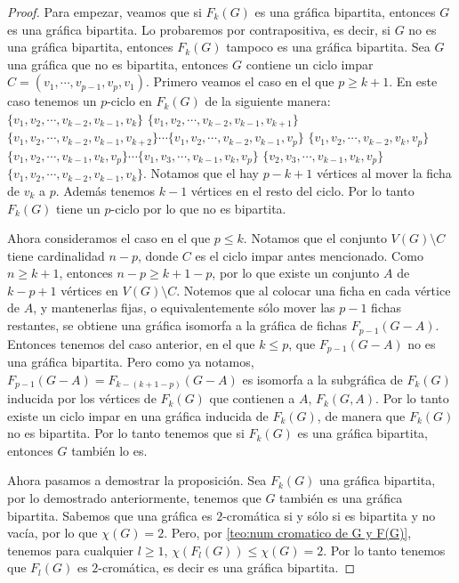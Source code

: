\begin{proof}
    Para empezar, veamos que si $F_k(G)$ es una gr\'afica bipartita, entonces
    $G$ es una gr\'afica bipartita. Lo probaremos por contrapositiva, es decir,
    si $G$ no es una gr\'afica bipartita, entonces $F_k(G)$ tampoco es una
    gr\'afica bipartita. Sea $G$ una gr\'afica que no es bipartita, entonces $G$
    contiene un ciclo impar $C=(v_1, \cdots, v_{p-1}, v_p, v_1)$. Primero veamos
    el caso en el que $p \geq k+1$. En este caso tenemos un $p$-ciclo en
    $F_k(G)$ de la siguiente manera: $\{v_1, v_2, \cdots, v_{k-2}, v_{k-1},
    v_k\}$ $\{v_1, v_2, \cdots, v_{k-2}, v_{k-1}, v_{k+1}\}$ $\{v_1, v_2, \cdots,
    v_{k-2}, v_{k-1}, v_{k+2}\} \cdots \{v_1, v_2, \cdots, v_{k-2}, v_{k-1},
    v_p\}$ $\{v_1, v_2, \cdots, v_{k-2}, v_k, v_p\}$ $\{v_1, v_2, \cdots, v_{k-1},
    v_k, v_p\} \cdots \{v_1, v_3, \cdots, v_{k-1}, v_k, v_p\}$ $\{v_2, v_3,
    \cdots, v_{k-1}, v_k, v_p\}$ $\{v_1, v_2, \cdots, v_{k-2}, v_{k-1}, v_k\}$.
    Notamos que el hay $p-k+1$ v\'ertices al mover la ficha de $v_k$ a $p$.
    Adem\'as tenemos $k-1$ v\'ertices en el resto del ciclo. Por lo tanto
    $F_k(G)$ tiene un $p$-ciclo por lo que no es bipartita.
    
    Ahora consideramos el caso en el que $p \leq k$. Notamos que el conjunto
    $V(G)\setminus C$ tiene cardinalidad $n-p$, donde $C$ es el ciclo impar
    antes mencionado. Como $n \geq k+1$, entonces $n-p \geq k+1-p$, por lo que
    existe un conjunto $A$ de $k-p+1$ v\'ertices en $V(G)\setminus C$. Notemos
    que al colocar una ficha en cada v\'ertice de $A$, y mantenerlas fijas, o
    equivalentemente s\'olo mover las $p-1$ fichas restantes, se obtiene una
    gr\'afica isomorfa a la gr\'afica de fichas $F_{p-1}(G-A)$. Entonces tenemos
    del caso anterior, en el que $k \leq p$, que $F_{p-1}(G-A)$ no es una
    gr\'afica bipartita. Pero como ya notamos, $F_{p-1}(G-A) = F_{k-(k+1-p)}
    (G-A)$ es isomorfa a la subgr\'afica de $F_k(G)$ inducida por los v\'ertices
    de $F_k(G)$ que contienen a $A$, $F_k(G,A)$. Por lo tanto existe un ciclo
    impar en una gr\'afica inducida de $F_k(G)$, de manera que $F_k(G)$ no es
    bipartita. Por lo tanto tenemos que si $F_k(G)$ es una gr\'afica bipartita,
    entonces $G$ tambi\'en lo es.

    Ahora pasamos a demostrar la proposici\'on. Sea $F_k(G)$ una gr\'afica
    bipartita, por lo demostrado anteriormente, tenemos que $G$ tambi\'en es una
    gr\'afica bipartita. Sabemos que una gr\'afica es $2$-crom\'atica si y
    s\'olo si es bipartita y no vac\'ia, por lo que $\chi(G)=2$. Pero, por
    \cref{teo:num cromatico de G y F(G)}, tenemos para cualquier $l\geq 1$,
    $\chi (F_l(G)) \le \chi (G) = 2$. Por lo tanto tenemos que $F_l(G)$ es
    $2$-crom\'atica, es decir es una gr\'afica bipartita.
\end{proof}



